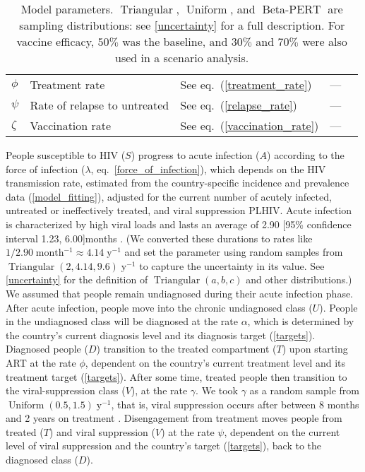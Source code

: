 \documentclass{article}
\DeclareMathOperator{\Uniform}{Uniform}
\DeclareMathOperator{\Triangular}{Triangular}
\DeclareMathOperator{\BetaPERT}{Beta-PERT}
\begin{document}
\begin{table}
\begin{center}
\begin{tabularx}{\textwidth}{lXlll}
      $\phi$ & Treatment rate & See eq.~(\ref{treatment_rate}) & --- \\
      $\psi$ & Rate of relapse to untreated & See eq.~(\ref{relapse_rate})
      & --- \\
      $\zeta$ & Vaccination rate & See eq.~(\ref{vaccination_rate}) & --- \\
      \hline
    \end{tabularx}
    \caption{Model parameters. $\Triangular$, $\Uniform$, and
      $\BetaPERT$ are sampling distributions: see
      \autoref{uncertainty} for a full description.  For vaccine
      efficacy, $50\%$ was the baseline, and $30\%$ and $70\%$ were
      also used in a scenario analysis.}
    \label{model_param}
  \end{center}
\end{table}

People susceptible to HIV ($S$) progress to acute infection ($A$)
according to the force of infection ($\lambda$,
eq.~\eqref{force_of_infection}), which depends on the HIV transmission
rate, estimated from the country-specific incidence and prevalence
data (\autoref{model_fitting}), adjusted for the current number of
acutely infected, untreated or ineffectively treated, and viral
suppression PLHIV.  Acute infection is characterized by high viral
loads and lasts an average of 2.90 [95\% confidence interval 1.23,
6.00]\;months \cite{Hollingsworth2008-iy}.  (We converted these
durations to rates like $1 / 2.90\;\text{month$^{-1}$} \approx
4.14\;\text{y$^{-1}$}$ and set the parameter using random samples from
$\Triangular(2, 4.14, 9.6)\;\text{y$^{-1}$}$ to capture the
uncertainty in its value.  See \autoref{uncertainty} for the
definition of $\Triangular(a, b, c)$ and other distributions.)  We
assumed that people remain undiagnosed during their acute infection
phase. After acute infection, people move into the chronic undiagnosed
class ($U$).  People in the undiagnosed class will be diagnosed at the
rate $\alpha$, which is determined by the country's current diagnosis
level and its diagnosis target (\autoref{targets}).  Diagnosed people
($D$) transition to the treated compartment ($T$) upon starting ART at
the rate $\phi$, dependent on the country's current treatment level
and its treatment target (\autoref{targets}).  After some time,
treated people then transition to the viral-suppression class ($V$),
at the rate $\gamma$.  We took $\gamma$ as a random sample from
$\Uniform(0.5, 1.5)\;\text{y$^{-1}$}$, that is, viral suppression
occurs after between 8 months and 2 years on treatment
\cite{Currie2009-yz}.  Disengagement from treatment moves people from
treated ($T$) and viral suppression ($V$) at the rate $\psi$,
dependent on the current level of viral suppression and the country's
target (\autoref{targets}), back to the diagnosed class ($D$).
\end{document}
